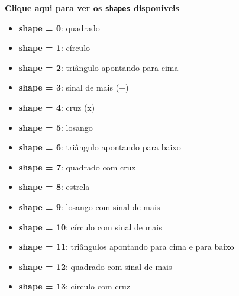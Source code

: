 \documentclass[
  letterpaper,
  DIV=11,
  numbers=noendperiod]{scrreprt}
\providecommand{\tightlist}{%
  \setlength{\itemsep}{0pt}\setlength{\parskip}{0pt}}
\begin{document}
\begin{tcolorbox}[enhanced jigsaw, bottomrule=.15mm, leftrule=.75mm, arc=.35mm, colframe=quarto-callout-note-color-frame, breakable, opacityback=0, toprule=.15mm, colback=white, left=2mm, rightrule=.15mm]
\begin{minipage}[t]{5.5mm}
\textcolor{quarto-callout-note-color}{\faInfo}
\end{minipage}%
\begin{minipage}[t]{\textwidth - 5.5mm}

\vspace{-3mm}\textbf{Clique aqui para ver os \texttt{shapes} disponíveis}\vspace{3mm}

\begin{itemize}
\tightlist
\item
  \textbf{shape = 0}: quadrado\\
\item
  \textbf{shape = 1}: círculo\\
\item
  \textbf{shape = 2}: triângulo apontando para cima\\
\item
  \textbf{shape = 3}: sinal de mais (+)\\
\item
  \textbf{shape = 4}: cruz (x)\\
\item
  \textbf{shape = 5}: losango\\
\item
  \textbf{shape = 6}: triângulo apontando para baixo\\
\item
  \textbf{shape = 7}: quadrado com cruz\\
\item
  \textbf{shape = 8}: estrela\\
\item
  \textbf{shape = 9}: losango com sinal de mais\\
\item
  \textbf{shape = 10}: círculo com sinal de mais\\
\item
  \textbf{shape = 11}: triângulos apontando para cima e para baixo\\
\item
  \textbf{shape = 12}: quadrado com sinal de mais\\
\item
  \textbf{shape = 13}: círculo com cruz\\

\end{itemize}
\end{minipage}
\end{tcolorbox}
\end{document}
